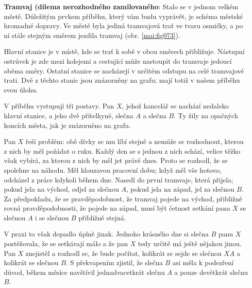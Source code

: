 \begin{mdframed}[style=mdexam]
  \begin{example}\label{mai:exam104}
    \textbf{Tramvaj (dilema nerozhodného zamilovaného}:\newline
    Stalo se v jednom velkém městě. Důležitým prvkem příběhu, který vám budu vyprávět, je schéma
    městské hromadné dopravy. Ve městě byla jediná tramvajová trať ve tvaru osmičky, a po ní stále
    stejným směrem jezdila tramvaj (obr. \ref{mai:fig073}).

    {\centering
    \captionsetup{type=figure}
    \par}

    Hlavní stanice je v místě, kde se trať k sobě v obou směrech přibližuje. Nástupní ostrůvek je
    zde mezi kolejemi a cestující může nastoupit do tramvaje jedoucí oběma směry. Ostatní stanice se
    nacházejí v určitém odstupu na celé tramvajové trati. Dvě z těchto stanic jsou znázorněny na
    grafu; mají totiž v našem příběhu svou úlohu.

    V příběhu vystupují tři postavy. Pan \(X\), jehož kancelář se nachází nedaleko hlavní stanice, a
    jeho dvě přítelkyně, slečna \(A\) a slečna \(B\). Ty žily na opačných koncích města, jak je
    znázorněno na grafu.

    Pan \(X\) řeší problém: obě dívky se mu líbí stejně a nemůže se rozhodnout, kterou z nich by měl
    požádat o ruku. Každý den se s jednou z nich schází, velice těžko však vybírá, za kterou z nich
    by měl jet právě dnes. Proto se rozhodl, že se spolehne na náhodu. Měl klouzavou pracovní dobu;
    když měl vše hotovo, odcházel z práce kdykoli během dne. Nasedl do první tramvaje, která
    přijela; pokud jela na východ, odjel za slečnou \(A\), pokud jela na západ, jel za slečnou
    \(B\). Za předpokladu, že se pravděpodobnost, že tramvaj pojede na východ, přibližně rovná
    pravděpodobnosti, že pojede na západ, musí být četnost setkání pana \(X\) se slečnou \(A\) i se
    slečnou \(B\) přibližně stejná.

    V praxi to však dopadlo úplně jinak. Jednoho krásného dne si slečna \(B\) panu \(X\)
    postěžovala, že se setkávají málo a že pan \(X\) tedy určitě má ještě nějakou jinou. Pan \(X\)
    znejistěl a rozhodl se, že bude počítat, kolikrát se sejde se slečnou \(XA\) a kolikrát se
    slečnou \(B\). S překvapením zjistil, že slečna \(B\) asi měla k podezření důvod, během měsíce
    navštívil jednadvacetkrát slečnu \(A\) a pouze devětkrát slečnu \(B\).


\end{example}
\end{mdframed}
